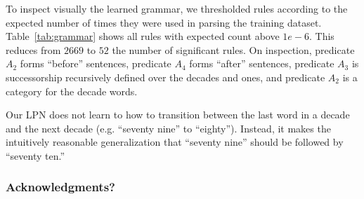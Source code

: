 \documentclass{article} %
\begin{document}
To inspect visually the learned grammar, we thresholded rules
according to the expected number of times they were used in parsing
the training dataset. Table~\ref{tab:grammar} shows all rules with
expected count above $1e-6$. This reduces from $2669$ to $52$ the
number of significant rules. On inspection, predicate $A_2$ forms
``before'' sentences, predicate $A_4$ forms ``after'' sentences,
predicate $A_3$ is successorship recursively defined over the decades
and ones, and predicate $A_2$ is a category for the decade words.

Our LPN does not learn to how to transition between the last word in a decade
and the next decade (e.g. ``seventy nine'' to ``eighty''). Instead, it
makes the intuitively reasonable generalization that ``seventy nine''
should be followed by ``seventy ten.'' 

\subsubsection*{Acknowledgments?}



\end{document}
